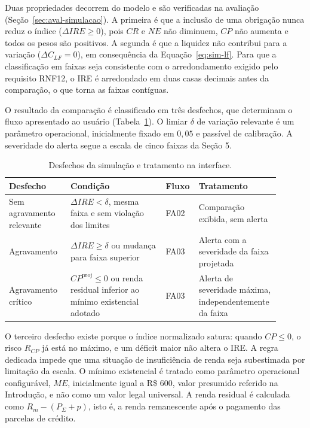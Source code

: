 \documentclass[portuguese]{sbc2025}%
\begin{document}
Duas propriedades decorrem do modelo e são verificadas na avaliação (Seção~\ref{sec:aval-simulacao}). A primeira é que a inclusão de uma obrigação nunca reduz o índice ($\Delta IRE \ge 0$), pois $CR$ e $NE$ não diminuem, $CP$ não aumenta e todos os pesos são positivos. A segunda é que a liquidez não contribui para a variação ($\Delta C_{LF} = 0$), em consequência da Equação~\ref{eq:sim-lf}. Para que a classificação em faixas seja consistente com o arredondamento exigido pelo requisito RNF12, o IRE é arredondado em duas casas decimais antes da comparação, o que torna as faixas contíguas.

O resultado da comparação é classificado em três desfechos, que determinam o fluxo apresentado ao usuário (Tabela~\ref{tab:desfechos}). O limiar $\delta$ de variação relevante é um parâmetro operacional, inicialmente fixado em $0{,}05$ e passível de calibração. A severidade do alerta segue a escala de cinco faixas da Seção 5.

\begin{table}[!ht]
\caption{Desfechos da simulação e tratamento na interface.}
\centering
\footnotesize
\begin{tabular}{@{}>{\raggedright\arraybackslash}p{0.22\linewidth}>{\raggedright\arraybackslash}p{0.34\linewidth}>{\raggedright\arraybackslash}p{0.08\linewidth}>{\raggedright\arraybackslash}p{0.26\linewidth}@{}}
\hline\hline
\textbf{Desfecho} & \textbf{Condição} & \textbf{Fluxo} & \textbf{Tratamento} \\
\hline
Sem agravamento relevante & $\Delta IRE < \delta$, mesma faixa e sem violação dos limites & FA02 & Comparação exibida, sem alerta \\
Agravamento & $\Delta IRE \ge \delta$ ou mudança para faixa superior & FA03 & Alerta com a severidade da faixa projetada \\
Agravamento crítico & $CP^{\mathrm{proj}} \le 0$ ou renda residual inferior ao mínimo existencial adotado & FA03 & Alerta de severidade máxima, independentemente da faixa \\
\hline\hline
\end{tabular}
\label{tab:desfechos}
\end{table}

O terceiro desfecho existe porque o índice normalizado satura: quando $CP \le 0$, o risco $R_{CP}$ já está no máximo, e um déficit maior não altera o IRE. A regra dedicada impede que uma situação de insuficiência de renda seja subestimada por limitação da escala. O mínimo existencial é tratado como parâmetro operacional configurável, $ME$, inicialmente igual a R\$ 600, valor presumido referido na Introdução, e não como um valor legal universal. A renda residual é calculada como $R_m - (P_\Sigma + p)$, isto é, a renda remanescente após o pagamento das parcelas de crédito.
\end{document}
